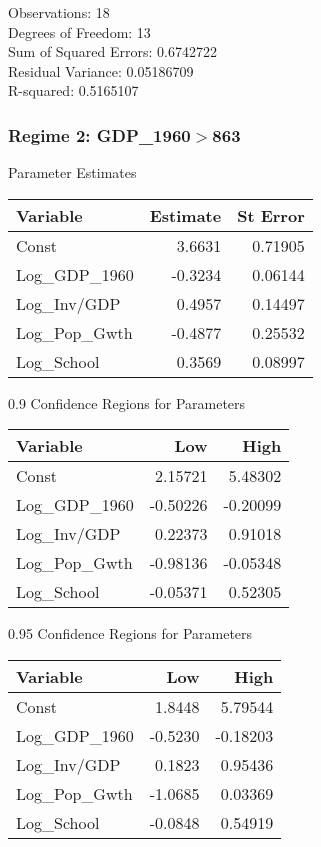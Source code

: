 Observations:                       18 \\
Degrees of Freedom:                 13 \\
Sum of Squared Errors:              0.6742722 \\
Residual Variance:                  0.05186709 \\
R-squared:                          0.5165107 \\

\subsubsection*{Regime 2: GDP\_1960$>$863 } 
Parameter Estimates \\
\begin{tabular}{l*{2}{r}}
\toprule
Variable    &   Estimate     &   St Error \\
\midrule 
Const   &    3.6631   &   0.71905 \\
Log\_GDP\_1960   &   -0.3234   &   0.06144 \\
Log\_Inv/GDP   &    0.4957   &   0.14497 \\
Log\_Pop\_Gwth   &   -0.4877   &   0.25532 \\
Log\_School   &    0.3569   &   0.08997 \\
\bottomrule
\end{tabular}
\bigskip 

0.9 Confidence Regions for Parameters \\
\begin{tabular}{l*{2}{r}}
\toprule
Variable    &   Low            &   High \\
\midrule 
Const   &    2.15721   &    5.48302 \\
Log\_GDP\_1960   &   -0.50226   &   -0.20099 \\
Log\_Inv/GDP   &    0.22373   &    0.91018 \\
Log\_Pop\_Gwth   &   -0.98136   &   -0.05348 \\
Log\_School   &   -0.05371   &    0.52305 \\
\bottomrule
\end{tabular}
\bigskip 

0.95 Confidence Regions for Parameters \\
\begin{tabular}{l*{2}{r}}
\toprule
Variable    &   Low            &   High \\
\midrule 
Const   &    1.8448   &    5.79544 \\
Log\_GDP\_1960   &   -0.5230   &   -0.18203 \\
Log\_Inv/GDP   &    0.1823   &    0.95436 \\
Log\_Pop\_Gwth   &   -1.0685   &    0.03369 \\
Log\_School   &   -0.0848   &    0.54919 \\
\bottomrule
\end{tabular}
\bigskip 

